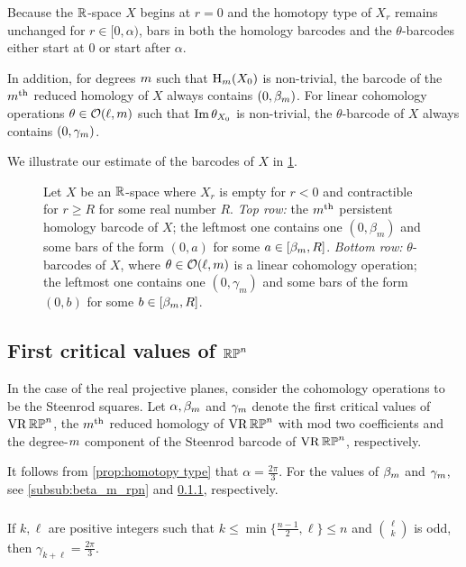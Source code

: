 Because the $\mathbb{R}$-space $X$ begins at $r=0$ and the homotopy type of $X_r$ remains unchanged for $r\in [0,\alpha)$, bars in both the homology barcodes and the $\theta$-barcodes either start at $0$ or start after $\alpha$.

In addition, for degrees $m$ such that $\mathrm{H}_m(X_0)$ is non-trivial, the barcode of the $m^{\mathrm{th}}$ reduced homology of $X$ always contains $(0,\beta_m )$.
For linear cohomology operations $\theta \in \mathcal{O}(\ell, m)$ such that $\operatorname{Im} \theta_{X_0}$ is non-trivial, the $\theta$-barcode of $X$ always contains $(0,\gamma_m )$.

We illustrate our estimate of the barcodes of $X$ in \cref{fig:barcodes_general}.

\begin{figure}
	\centering
	
	\caption{Let $X$ be an $\mathbb{R}$-space where $X_r$ is empty for $r<0$ and contractible for $r\geq R$ for some real number $R$. \emph{Top row:} the $m^{\mathrm{th}}$ persistent homology barcode of $X$; the leftmost one contains one $(0,\beta_m)$ and some bars of the form $(0,a)$ for some $a\in [\beta_m, R]$.
    \emph{Bottom row:} $\theta$-barcodes of $X$, where $\theta\in\mathcal{O}(\ell,m)$ is a linear cohomology operation; the leftmost one contains one $(0,\gamma_m)$ and some bars of the form $(0,b)$ for some $b\in [\beta_m, R]$.}
	\label{fig:barcodes_general}
\end{figure}

\subsection{First critical values of $\mathbb{RP}^n$}
\label{sub:first_critical_value_rpn}

In the case of the real projective planes, consider the cohomology operations to be the Steenrod squares. 
Let $\alpha, \beta_m$ and $\gamma_m$ denote the first critical values of $\operatorname{VR}\mathbb{RP}^n$, the $m^{\mathrm{th}}$ reduced homology of $\operatorname{VR}\mathbb{RP}^n$ with mod two coefficients and the degree-$m$ component of the Steenrod barcode of $\operatorname{VR}\mathbb{RP}^n$, respectively. 

It follows from \cref{prop:homotopy type} that $\alpha = \frac{2\pi}{3}$.
For the values of $\beta_m$ and $\gamma_m$, see \cref{subsub:beta_m_rpn} and \cref{subsub:gamma_rpn}, respectively.

\subsubsection{}
\label{subsub:gamma_rpn}
\proposition
If $k,\ell$ are positive integers such that $k \leq \min\{\frac{n-1}{2}, \ell\} \leq n$ and $\binom{\ell}{k}$ is odd, then $\gamma_{k+\ell} = \tfrac{2\pi}{3}$.

